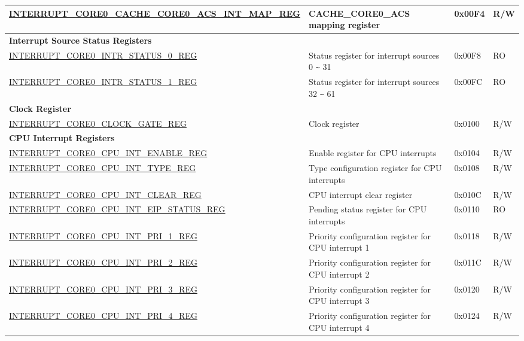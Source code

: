 \begin{longtable}{ | p{10cm} | m{9cm} | m{1.3cm} | m{1.0cm} | }
\hyperref[regdesc:INTERRUPTCORE0CACHECORE0ACSINTMAPREG]{INTERRUPT\_CORE0\_CACHE\_CORE0\_ACS\_INT\_MAP\_REG} & CACHE\_CORE0\_ACS mapping register & 0x00F4 & R/W \\ \hline
\multicolumn{4}{|l|}{\textbf{Interrupt Source Status Registers}} \\ \hline
\hyperref[regdesc:INTERRUPTCORE0INTRSTATUS0REG]{INTERRUPT\_CORE0\_INTR\_STATUS\_0\_REG} & Status register for interrupt sources 0 \verb+~+ 31 & 0x00F8 & RO \\ \hline
\hyperref[regdesc:INTERRUPTCORE0INTRSTATUS1REG]{INTERRUPT\_CORE0\_INTR\_STATUS\_1\_REG} & Status register for interrupt sources 32 \verb+~+ 61 & 0x00FC & RO \\ \hline
\multicolumn{4}{|l|}{\textbf{Clock Register}} \\ \hline
\hyperref[regdesc:INTERRUPTCORE0CLOCKGATEREG]{INTERRUPT\_CORE0\_CLOCK\_GATE\_REG} & Clock register & 0x0100 & R/W \\ \hline
\multicolumn{4}{|l|}{\textbf{CPU Interrupt Registers}} \\ \hline
\hyperref[regdesc:INTERRUPTCORE0CPUINTENABLEREG]{INTERRUPT\_CORE0\_CPU\_INT\_ENABLE\_REG} & Enable register for CPU interrupts & 0x0104 & R/W \\ \hline
\hyperref[regdesc:INTERRUPTCORE0CPUINTTYPEREG]{INTERRUPT\_CORE0\_CPU\_INT\_TYPE\_REG} & Type configuration register for CPU interrupts & 0x0108 & R/W \\ \hline
\hyperref[regdesc:INTERRUPTCORE0CPUINTCLEARREG]{INTERRUPT\_CORE0\_CPU\_INT\_CLEAR\_REG} & CPU interrupt clear register & 0x010C & R/W \\ \hline
\hyperref[regdesc:INTERRUPTCORE0CPUINTEIPSTATUSREG]{INTERRUPT\_CORE0\_CPU\_INT\_EIP\_STATUS\_REG} & Pending status register for CPU interrupts & 0x0110 & RO \\ \hline
\hyperref[regdesc:INTERRUPTCORE0CPUINTPRI0REG]{INTERRUPT\_CORE0\_CPU\_INT\_PRI\_1\_REG} & Priority configuration register for CPU interrupt 1 & 0x0118 & R/W \\ \hline
\hyperref[regdesc:INTERRUPTCORE0CPUINTPRI0REG]{INTERRUPT\_CORE0\_CPU\_INT\_PRI\_2\_REG} & Priority configuration register for CPU interrupt 2  & 0x011C & R/W \\ \hline
\hyperref[regdesc:INTERRUPTCORE0CPUINTPRI0REG]{INTERRUPT\_CORE0\_CPU\_INT\_PRI\_3\_REG} & Priority configuration register for CPU interrupt 3 & 0x0120 & R/W \\ \hline
\hyperref[regdesc:INTERRUPTCORE0CPUINTPRI0REG]{INTERRUPT\_CORE0\_CPU\_INT\_PRI\_4\_REG} & Priority configuration register for CPU interrupt 4 & 0x0124 & R/W \\ \hline

\end{longtable}
